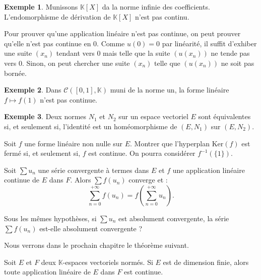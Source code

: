 \documentclass[french]{article}
\newcommand{\K}{\mathbb{K}}
\newcommand{\inv}{^{-1}}
\renewcommand{\ker}{\text{Ker}}
\theoremstyle{plain}
\theoremstyle{definition}
\newtheorem*{ex}{Exemple}
\theoremstyle{remark}
\begin{document}
\begin{ex}
	Munissons $\K[X]$ da la norme infinie des coefficients. L'endomorphisme de dérivation de $\K[X]$ n'est pas continu. %
\end{ex}

\begin{met}
	Pour prouver qu'une application linéaire n'est pas continue, on peut prouver qu'elle n'est pas continue en $0$. Comme $u(0)=0$ par linéarité, il suffit d'exhiber une suite $(x_n)$ tendant vers $0$ mais telle que la suite $(u(x_n))$ ne tende pas vers $0$. Sinon, on peut chercher une suite $(x_n)$ telle que $(u(x_n))$ ne soit pas bornée.
\end{met}

\begin{ex}
	Dans $\mathcal{C}([0,1],\K)$ muni de la norme un, la forme linéaire $f\mapsto f(1)$ n'est pas continue. %
\end{ex}

\begin{ex}
	Deux normes $N_1$ et $N_2$ sur un espace vectoriel $E$ sont équivalentes si, et seulement si, l'identité est un homéomorphisme de $(E,N_1)$ sur $(E,N_2)$.
\end{ex}

\begin{exo}
	Soit $f$ une forme linéaire non nulle sur $E$. Montrer que l'hyperplan $\ker(f)$ est fermé si, et seulement si, $f$ est continue. On pourra considérer $f\inv(\{1\})$.
\end{exo}

\begin{prop}%
	Soit $\displaystyle\sum u_n$ une série convergente à termes dans $E$ et $f$ une application linéaire continue de $E$ dans $F$. Alors $\displaystyle\sum f(u_n)$ converge et : $$\sum_{n=0}^{+\infty}f(u_n)=f\left(\sum_{n=0}^{+\infty}u_n\right).$$
\end{prop}

\begin{exo}
	Sous les mêmes hypothèses, si $\displaystyle\sum u_n$ est absolument convergente, la série $\displaystyle\sum f(u_n)$ est-elle absolument convergente ?
\end{exo}

Nous verrons dans le prochain chapitre le théorème suivant.

\begin{thm}%
	Soit $E$ et $F$ deux $\K$-espaces vectoriels normés. Si $E$ est de dimension finie, alors toute application linéaire de $E$ dans $F$ est continue.
\end{thm}
\end{document}
